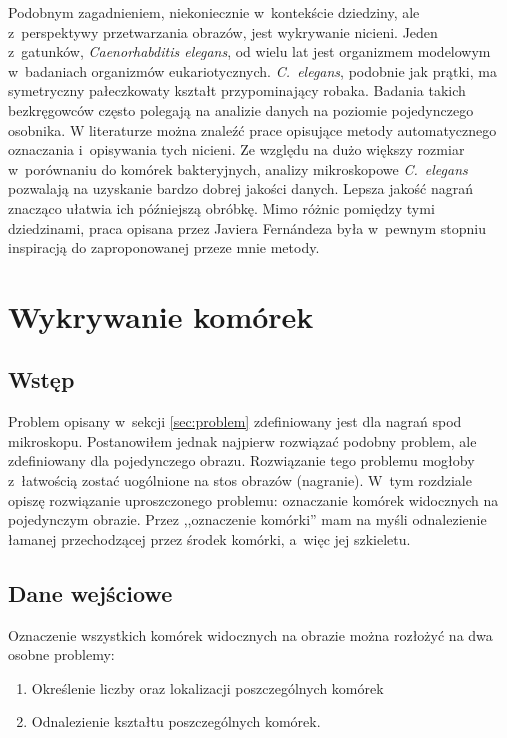 \documentclass[declaration,shortabstract,mgr]{iithesis}
\begin{document}

Podobnym zagadnieniem, niekoniecznie w~kontekście dziedziny, ale z~perspektywy przetwarzania obrazów, jest wykrywanie nicieni.
Jeden z~gatunków, \emph{Caenorhabditis elegans}, od wielu lat jest organizmem modelowym w~badaniach organizmów eukariotycznych\cite{wiki:c-elegans}.
\emph{C.~elegans}, podobnie jak prątki, ma symetryczny pałeczkowaty kształt przypominający robaka.
Badania takich bezkręgowców często polegają na analizie danych na poziomie pojedynczego osobnika.
W literaturze można znaleźć prace opisujące metody automatycznego oznaczania i~opisywania tych nicieni.
Ze względu na dużo większy rozmiar w~porównaniu do komórek bakteryjnych, analizy mikroskopowe \emph{C.~elegans} pozwalają na uzyskanie bardzo dobrej jakości danych.
Lepsza jakość nagrań znacząco ułatwia ich późniejszą obróbkę.
Mimo różnic pomiędzy tymi dziedzinami, praca opisana przez Javiera Fernándeza\cite{paper:worm-detection} była w~pewnym stopniu inspiracją do zaproponowanej przeze mnie metody.


\section{Wykrywanie komórek}
\label{sec:cell-detection}

\subsection{Wstęp}

Problem opisany w~sekcji \ref{sec:problem} zdefiniowany jest dla nagrań spod mikroskopu. Postanowiłem jednak najpierw rozwiązać podobny problem, ale zdefiniowany dla pojedynczego obrazu. Rozwiązanie tego problemu mogłoby z~łatwością zostać uogólnione na stos obrazów (nagranie). W~tym rozdziale opiszę rozwiązanie uproszczonego problemu: oznaczanie komórek widocznych na pojedynczym obrazie. Przez ,,oznaczenie komórki'' mam na myśli odnalezienie łamanej przechodzącej przez środek komórki, a~więc jej szkieletu.

\subsection{Dane wejściowe}
\label{sec:detection-input}

Oznaczenie wszystkich komórek widocznych na obrazie można rozłożyć na dwa osobne problemy:
\begin{enumerate}
  \item Określenie liczby oraz lokalizacji poszczególnych komórek
  \item Odnalezienie kształtu poszczególnych komórek.
\end{enumerate}
\end{document}
